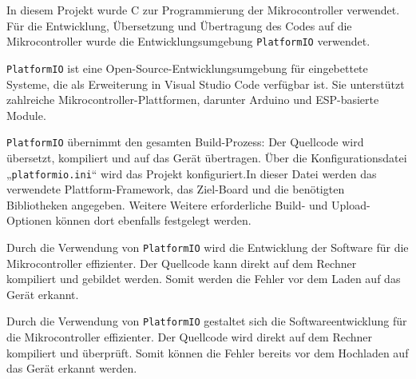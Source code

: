 \documentclass[12pt, letterpaper]{article}
\begin{document}
  \par In diesem Projekt wurde C zur Programmierung der Mikrocontroller verwendet. Für die Entwicklung, Übersetzung und Übertragung des Codes auf die Mikrocontroller wurde die Entwicklungsumgebung \texttt{PlatformIO} verwendet.
  \par  \texttt{PlatformIO} \cite{platformio} ist eine Open-Source-Entwicklungsumgebung für eingebettete Systeme, die als Erweiterung in Visual Studio Code verfügbar ist. Sie unterstützt zahlreiche Mikrocontroller-Plattformen, darunter Arduino und ESP-basierte Module.
  \par \texttt{PlatformIO} übernimmt den gesamten Build-Prozess: Der Quellcode wird übersetzt, kompiliert und auf das Gerät übertragen. Über die Konfigurationsdatei „\texttt{platformio.ini}“ wird das Projekt konfiguriert.In dieser Datei werden das verwendete Plattform-Framework, das Ziel-Board und die benötigten Bibliotheken angegeben. Weitere Weitere erforderliche Build- und Upload-Optionen können dort ebenfalls festgelegt werden.
  \par Durch die Verwendung von \texttt{PlatformIO} wird die Entwicklung der Software für die Mikrocontroller effizienter. Der Quellcode kann direkt auf dem Rechner kompiliert und gebildet werden. Somit werden die Fehler vor dem Laden auf das Gerät erkannt.
  \par Durch die Verwendung von \texttt{PlatformIO} gestaltet sich die Softwareentwicklung für die Mikrocontroller effizienter. Der Quellcode wird direkt auf dem Rechner kompiliert und überprüft. Somit können die Fehler bereits vor dem Hochladen auf das Gerät erkannt werden.
\end{document}
